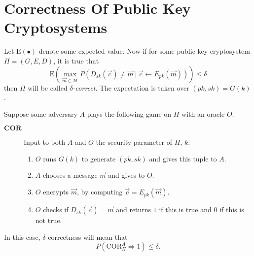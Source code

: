 \section{Correctness Of Public Key Cryptosystems}
\label{sec:correctness}

Let $\mathrm{E}\left(\bullet\right)$ denote some expected value. Now if for some public key cryptosystem $\Pi = \left(G,E,D\right)$, it is true that
\[
	\mathrm{E}\left( \max\limits_{\vec{m} \in \mathcal{M}} P\left(D_{sk}\left(\vec{c}\right) \neq \vec{m} \ \vert \ \vec{c} \leftarrow E_{pk}\left(\vec{m}\right)\right) \right) \leq \delta
\]
then $\Pi$ will be called \emph{$\delta$-correct}. The expectation is taken over $\left(pk,sk\right) = G\left(k\right)$.

Suppose some adversary $A$ plays the following game on $\Pi$ with an oracle $O$.
\begin{description}
	\item[$\mathrm{\mathbf{COR}}$] Input to both $A$ and $O$ the security parameter of $\Pi$, $k$.
	\begin{enumerate}
		\item $O$ runs $G\left(k\right)$ to generate $\left(pk,sk\right)$ and gives this tuple to $A$.
		\item $A$ chooses a message $\vec{m}$ and gives to $O$.
		\item $O$ encrypts $\vec{m}$, by computing $\vec{c} = E_{pk}\left(\vec{m}\right)$.
		\item $O$ checks if $D_{sk}\left(\vec{c}\right) = \vec{m}$ and returns $1$ if this is true and $0$ if this is not true.
	\end{enumerate}
\end{description}
In this case, $\delta$-correctness will mean that
\[
	P\left( \mathrm{COR}^A_{\Pi} \Rightarrow 1 \right) \leq \delta.
\]

